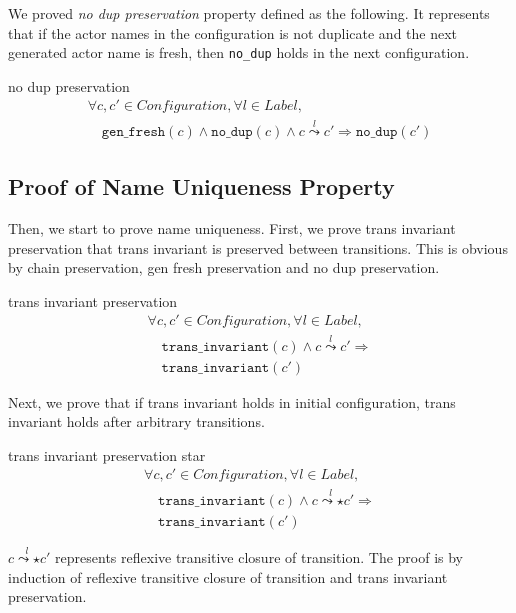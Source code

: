 We proved \textit{no dup preservation} property defined as the following.
It represents that if the actor names in the configuration is not duplicate and the next generated actor name is fresh, then \texttt{no\_dup} holds in the next configuration.

\begin{lemma}{no dup preservation}
\begin{displaymath}
  \begin{array}{l}
    \forall c, c' \in \textit{Configuration}, \forall l \in \textit{Label}, \\
    \quad \texttt{gen\_fresh}(c) \wedge \texttt{no\_dup}(c) \wedge c \overset{l}{\leadsto} c' \Rightarrow \texttt{no\_dup}(c')
  \end{array}
\end{displaymath}
\end{lemma}

\subsection{Proof of Name Uniqueness Property}
Then, we start to prove name uniqueness.
First, we prove trans invariant preservation that trans invariant is preserved between transitions.
This is obvious by chain preservation, gen fresh preservation and no dup preservation.
\begin{lemma}{trans invariant preservation}
  \begin{displaymath}
    \begin{array}{l}
      \forall c, c' \in \textit{Configuration}, \forall l \in \textit{Label}, \\
      \quad \texttt{trans\_invariant}(c) \wedge c \overset{l}{\leadsto} c' \Rightarrow \\
      \quad \texttt{trans\_invariant}(c')
    \end{array}
  \end{displaymath}
\end{lemma}

Next, we prove that if trans invariant holds in initial configuration, trans invariant holds after arbitrary transitions.


\begin{lemma}{trans invariant preservation star}
  \begin{displaymath}
    \begin{array}{l}
      \forall c, c' \in \textit{Configuration}, \forall l \in \textit{Label}, \\
      \quad \texttt{trans\_invariant}(c) \wedge c \overset{l}{\leadsto\star} c' \Rightarrow \\
      \quad \texttt{trans\_invariant}(c')
    \end{array}
  \end{displaymath}
\end{lemma}
$c \overset{l}{\leadsto\star} c'$ represents reflexive transitive closure of transition.
The proof is by induction of reflexive transitive closure of transition and trans invariant preservation.

